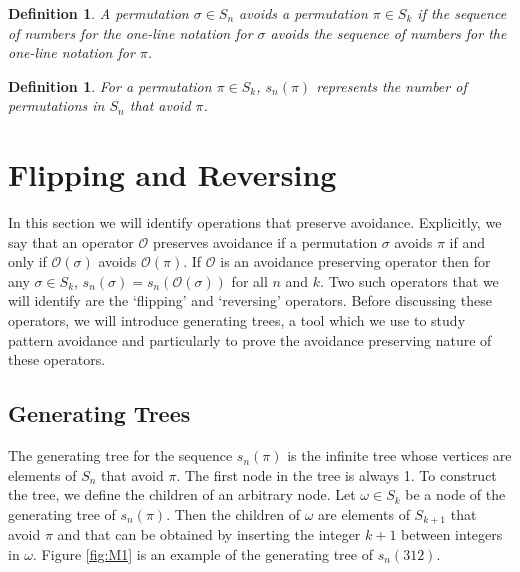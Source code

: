 \documentclass[11pt,letterpaper,twoside,english]{article}
\theoremstyle{theorem}
\newtheorem{definition}[theorem]{Definition}
\theoremstyle{remark}
\begin{document}
\begin{definition} 
A permutation $\sigma\in S_n$ avoids a permutation $\pi\in S_k$ if the sequence of numbers for the one-line notation for $\sigma$ avoids the sequence of numbers for the one-line notation for $\pi$.
\end{definition}

\begin{definition}
For a permutation $\pi\in S_k$, $s_n(\pi)$ represents the number of permutations in $S_n$ that avoid $\pi$. 
\end{definition}



\section{Flipping and Reversing}

In this section we will identify operations that preserve avoidance. Explicitly, we say that an operator $\mathcal{O}$ preserves avoidance if a permutation $\sigma$ avoids $\pi$ if and only if $\mathcal{O}(\sigma)$ avoids $\mathcal{O}(\pi)$. If $\mathcal{O}$ is an avoidance preserving operator then for any $\sigma\in S_k$, $s_n(\sigma)=s_n(\mathcal{O}(\sigma))$ for all $n$ and $k$. Two such operators that we will identify are the `flipping' and `reversing' operators.  Before discussing these operators, we will introduce generating trees, a tool which we use to study pattern avoidance and particularly to prove the avoidance preserving nature of these operators. 

\subsection{Generating Trees}

The generating tree for the sequence $s_n(\pi)$ is the infinite tree whose vertices are elements of $S_n$ that avoid $\pi$. The first node in the tree is always 1. To construct the tree, we define the children of an arbitrary node. Let $\omega\in S_k$ be a node of the generating tree of $s_n(\pi)$. Then the children of $\omega$ are elements of $S_{k+1}$ that avoid $\pi$ and that can be obtained by inserting the integer $k+1$ between integers in $\omega$. Figure \ref{fig:M1} is an example of the generating tree of $s_n(312)$. 
\end{document}
